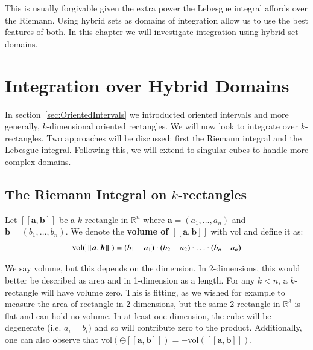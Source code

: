 This is usually forgivable given the extra power the Lebesgue integral affords over the Riemann.
Using hybrid sets as domains of integration allow us to use the best features of both.
In this chapter we will investigate integration using hybrid set domains.






%
%
\section{Integration over Hybrid Domains}

In section~\ref{sec:OrientedIntervals} we introducted oriented intervals and more generally, 
$k$-dimensional oriented rectangles.
We will now look to integrate over $k$-rectangles. 
Two approaches will be discussed: first the Riemann integral and the Lebesgue integral.
Following this, we will extend to singular cubes to handle more complex domains.




\subsection{The Riemann Integral on $k$-rectangles}

\begin{definition}
	Let $[\![\boldsymbol{a}, \boldsymbol{b}]\!]$ be a $k$-rectangle in $\mathbb{R}^n$ 
	where $\boldsymbol{a}=(a_1,\ldots, a_n)$ and $\boldsymbol{b}=(b_1,\ldots, b_n)$. 
	We denote the \textbf{volume of $\boldsymbol{[\![a,b]\!]}$} with $\text{vol}$ and define it as:
	\begin{equation}
		\text{vol}(\; [\![\boldsymbol{a}, \boldsymbol{b} ]\!] \;) 
			= (b_1 - a_1) \cdot (b_2 - a_2) \cdot \ldots \cdot (b_n - a_n)
	\end{equation}
\end{definition}

We say volume, but this depends on the dimension.
In 2-dimensions, this would better be described as area and in 1-dimension as a length.
For any $k<n$, a $k$-rectangle will have volume zero.
This is fitting, as we wished for example to measure the area of rectangle in 2 dimensions, but the same 2-rectangle in
$\mathbb{R}^3$ is flat and can hold no volume.
In at least one dimension, the cube will be degenerate (i.e. $a_i = b_i$) and so will contribute zero to the product.
Additionally, one can also observe that $\text{vol}( \ominus [\![\boldsymbol{a}, \boldsymbol{b} ]\!]) 
= - \text{vol}( [\![ \boldsymbol{a}, \boldsymbol{b} ]\!] )$.


